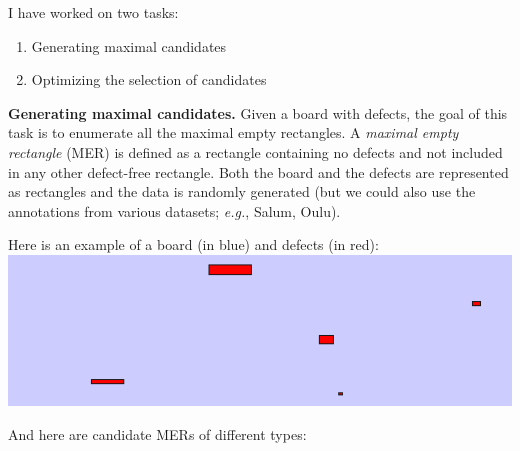 \documentclass[
]{article}
\date{}
\providecommand{\tightlist}{%
  \setlength{\itemsep}{0pt}\setlength{\parskip}{0pt}}
\begin{document}
I have worked on two tasks:

\begin{enumerate}
\def\labelenumi{\arabic{enumi}.}
\tightlist
\item
  Generating maximal candidates
\item
  Optimizing the selection of candidates
\end{enumerate}

\textbf{Generating maximal candidates.} Given a board with defects, the
goal of this task is to enumerate all the maximal empty rectangles. A
\emph{maximal empty rectangle} (MER) is defined as a rectangle
containing no defects and not included in any other defect-free
rectangle. Both the board and the defects are represented as rectangles
and the data is randomly generated (but we could also use the
annotations from various datasets; \emph{e.g.}, Salum, Oulu).

Here is an example of a board (in blue) and defects (in red): \\
\includegraphics{imgs/board.png}

And here are candidate MERs of different types:
\end{document}
